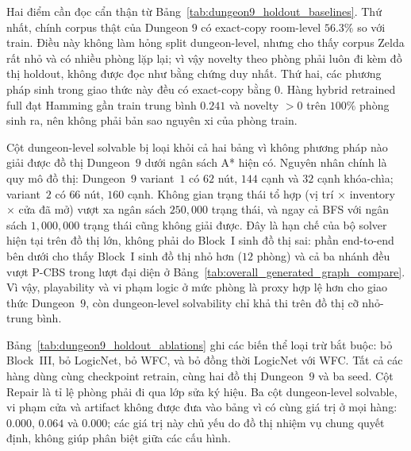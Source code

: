 \documentclass[oneside,a4paper,12pt]{extreport}
\begin{document}
Hai điểm cần đọc cẩn thận từ Bảng~\ref{tab:dungeon9_holdout_baselines}. Thứ nhất, chính corpus thật của Dungeon $9$ có exact-copy room-level $56.3\%$ so với train. Điều này không làm hỏng split dungeon-level, nhưng cho thấy corpus Zelda rất nhỏ và có nhiều phòng lặp lại; vì vậy novelty theo phòng phải luôn đi kèm đồ thị holdout, không được đọc như bằng chứng duy nhất. Thứ hai, các phương pháp sinh trong giao thức này đều có exact-copy bằng $0$. Hàng hybrid retrained full đạt Hamming gần train trung bình $0.241$ và novelty $>0$ trên $100\%$ phòng sinh ra, nên không phải bản sao nguyên xi của phòng train.

Cột dungeon-level solvable bị loại khỏi cả hai bảng vì không phương pháp nào giải được đồ thị Dungeon~$9$ dưới ngân sách A* hiện có. Nguyên nhân chính là quy mô đồ thị: Dungeon~$9$ variant~$1$ có $62$ nút, $144$ cạnh và $32$ cạnh khóa-chìa; variant~$2$ có $66$ nút, $160$ cạnh. Không gian trạng thái tổ hợp (vị trí $\times$ inventory $\times$ cửa đã mở) vượt xa ngân sách $250{,}000$ trạng thái, và ngay cả BFS với ngân sách $1{,}000{,}000$ trạng thái cũng không giải được. Đây là hạn chế của bộ solver hiện tại trên đồ thị lớn, không phải do Block~I sinh đồ thị sai: phần end-to-end bên dưới cho thấy Block~I sinh đồ thị nhỏ hơn ($12$ phòng) và cả ba nhánh đều vượt P-CBS trong lượt đại diện ở Bảng~\ref{tab:overall_generated_graph_compare}. Vì vậy, playability và vi phạm logic ở mức phòng là proxy hợp lệ hơn cho giao thức Dungeon~$9$, còn dungeon-level solvability chỉ khả thi trên đồ thị cỡ nhỏ-trung bình.


Bảng~\ref{tab:dungeon9_holdout_ablations} ghi các biến thể loại trừ bắt buộc: bỏ Block~III, bỏ LogicNet, bỏ WFC, và bỏ đồng thời LogicNet với WFC. Tất cả các hàng dùng cùng checkpoint retrain, cùng hai đồ thị Dungeon~$9$ và ba seed. Cột Repair là tỉ lệ phòng phải đi qua lớp sửa ký hiệu. Ba cột dungeon-level solvable, vi phạm cửa và artifact không được đưa vào bảng vì có cùng giá trị ở mọi hàng: $0.000$, $0.064$ và $0.000$; các giá trị này chủ yếu do đồ thị nhiệm vụ chung quyết định, không giúp phân biệt giữa các cấu hình.
\end{document}
